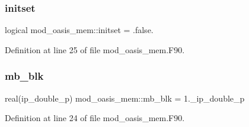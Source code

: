 \subsubsection{\texorpdfstring{initset}{initset}}
{\footnotesize\ttfamily logical mod\+\_\+oasis\+\_\+mem\+::initset = .false.\hspace{0.3cm}{\ttfamily [private]}}



Definition at line 25 of file mod\+\_\+oasis\+\_\+mem.\+F90.

\mbox{\label{namespacemod__oasis__mem_a7c262f1c120ed57d527ee3de91552ee9}} 
\subsubsection{\texorpdfstring{mb\+\_\+blk}{mb\_blk}}
{\footnotesize\ttfamily real(ip\+\_\+double\+\_\+p) mod\+\_\+oasis\+\_\+mem\+::mb\+\_\+blk = 1.\+\_\+ip\+\_\+double\+\_\+p\hspace{0.3cm}{\ttfamily [private]}}



Definition at line 24 of file mod\+\_\+oasis\+\_\+mem.\+F90.

